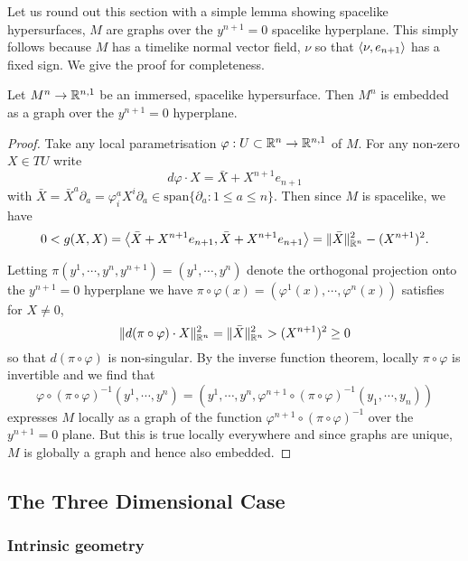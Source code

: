 \documentclass[a4paper, 12pt]{amsart}
\begin{document}
Let us round out this section with a simple lemma showing spacelike hypersurfaces, \(M\) are graphs over the \(y^{n+1} = 0\) spacelike hyperplane. This simply follows because \(M\) has a timelike normal vector field, \(\nu\) so that \(\left\langle \nu,e_{n+1} \right\rangle\) has a fixed sign. We give the proof for completeness.

\begin{lemma}
\label{lem:graph}

Let \(M^n \to \mathbb{R}^{n,1}\) be an immersed, spacelike hypersurface. Then \(M^n\) is embedded as a graph over the \(y^{n+1} = 0\) hyperplane.
\end{lemma}

\begin{proof}
Take any local parametrisation \(\varphi : U \subset \mathbb{R}^n \to \mathbb{R}^{n,1}\) of \(M\). For any non-zero \(X \in TU\) write
\[
d\varphi \cdot X = \bar{X} + X^{n+1} e_{n+1}
\]
with \(\bar{X} = \bar{X}^a \partial_a = \varphi^a_i X^i \partial_a \in \text{span} \{\partial_a : 1 \leq a \leq n\}\). Then since \(M\) is spacelike, we have
\[
0 < g(X, X) = \left\langle \bar{X} + X^{n+1} e_{n+1},\bar{X} + X^{n+1} e_{n+1} \right\rangle = \|\bar{X}\|_{\mathbb{R}^n}^2 - (X^{n+1})^2.
\]

Letting \(\pi(y^1, \cdots, y^n, y^{n+1}) = (y^1, \cdots, y^n)\) denote the orthogonal projection onto the \(y^{n+1} = 0\) hyperplane we have \(\pi \circ \varphi (x) = (\varphi^1(x), \cdots, \varphi^n(x))\) satisfies for \(X \ne 0\),
\[
\|d(\pi \circ \varphi) \cdot X\|_{\mathbb{R}^n}^2 = \|\bar{X}\|_{\mathbb{R}^n}^2  > (X^{n+1})^2 \geq 0
\]
so that \(d(\pi \circ \varphi)\) is non-singular. By the inverse function theorem, locally \(\pi \circ \varphi\) is invertible and we find that
\[
\varphi \circ (\pi \circ \varphi)^{-1} (y^1, \cdots, y^n) = (y^1, \cdots, y^n, \varphi^{n+1} \circ (\pi \circ \varphi)^{-1} (y_1, \cdots, y_n))
\]
expresses \(M\) locally as a graph of the function \(\varphi^{n+1} \circ (\pi \circ \varphi)^{-1}\) over the \(y^{n+1} = 0\) plane. But this is true locally everywhere and since graphs are unique, \(M\) is globally a graph and hence also embedded.
\end{proof}


\subsection{The Three Dimensional Case}
\label{subsec:notation_threedim}

\subsubsection{Intrinsic geometry}
\end{document}
